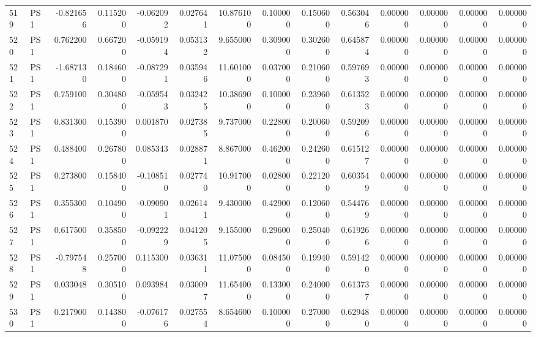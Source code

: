 \begin{tabular}{llrrrrrrrrrrrr}
519 &    PS1 & -0.821656 &      0.115200 & -0.062092 &    0.027641 &  10.876100 &      0.100000 &   0.150600 &  0.563046 &  0.000000 &   0.000000 &     0.000000 &     0.000000 \\
520 &    PS1 &  0.762200 &      0.667200 & -0.059194 &    0.053132 &   9.655000 &      0.309000 &   0.302600 &  0.645874 &  0.000000 &   0.000000 &     0.000000 &     0.000000 \\
521 &    PS1 & -1.687130 &      0.184600 & -0.087291 &    0.035946 &  11.601000 &      0.037000 &   0.210600 &  0.597693 &  0.000000 &   0.000000 &     0.000000 &     0.000000 \\
522 &    PS1 &  0.759100 &      0.304800 & -0.059543 &    0.032425 &  10.386900 &      0.100000 &   0.239600 &  0.613523 &  0.000000 &   0.000000 &     0.000000 &     0.000000 \\
523 &    PS1 &  0.831300 &      0.153900 &  0.001870 &    0.027385 &   9.737000 &      0.228000 &   0.200600 &  0.592096 &  0.000000 &   0.000000 &     0.000000 &     0.000000 \\
524 &    PS1 &  0.488400 &      0.267800 &  0.085343 &    0.028871 &   8.867000 &      0.462000 &   0.242600 &  0.615127 &  0.000000 &   0.000000 &     0.000000 &     0.000000 \\
525 &    PS1 &  0.273800 &      0.158400 & -0.108510 &    0.027740 &  10.917000 &      0.028000 &   0.221200 &  0.603549 &  0.000000 &   0.000000 &     0.000000 &     0.000000 \\
526 &    PS1 &  0.355300 &      0.104900 & -0.090901 &    0.026141 &   9.430000 &      0.429000 &   0.120600 &  0.544769 &  0.000000 &   0.000000 &     0.000000 &     0.000000 \\
527 &    PS1 &  0.617500 &      0.358500 & -0.092229 &    0.041205 &   9.155000 &      0.296000 &   0.250400 &  0.619266 &  0.000000 &   0.000000 &     0.000000 &     0.000000 \\
528 &    PS1 & -0.797548 &      0.257000 &  0.115300 &    0.036311 &  11.075000 &      0.084500 &   0.199400 &  0.591420 &  0.000000 &   0.000000 &     0.000000 &     0.000000 \\
529 &    PS1 &  0.033048 &      0.305100 &  0.093984 &    0.030097 &  11.654000 &      0.133000 &   0.240000 &  0.613737 &  0.000000 &   0.000000 &     0.000000 &     0.000000 \\
530 &    PS1 &  0.217900 &      0.143800 & -0.076176 &    0.027554 &   8.654600 &      0.100000 &   0.270000 &  0.629480 &  0.000000 &   0.000000 &     0.000000 &     0.000000 \\

\end{tabular}

